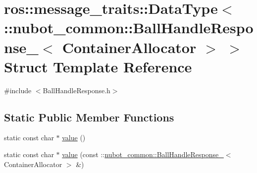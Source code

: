 \hypertarget{structros_1_1message__traits_1_1DataType_3_01_1_1nubot__common_1_1BallHandleResponse___3_01ContainerAllocator_01_4_01_4}{\section{ros\-:\-:message\-\_\-traits\-:\-:Data\-Type$<$ \-:\-:nubot\-\_\-common\-:\-:Ball\-Handle\-Response\-\_\-$<$ Container\-Allocator $>$ $>$ Struct Template Reference}
\label{structros_1_1message__traits_1_1DataType_3_01_1_1nubot__common_1_1BallHandleResponse___3_01ContainerAllocator_01_4_01_4}
}


{\ttfamily \#include $<$Ball\-Handle\-Response.\-h$>$}

\subsection*{Static Public Member Functions}
\begin{DoxyCompactItemize}
\item 
static const char $\ast$ \hyperlink{structros_1_1message__traits_1_1DataType_3_01_1_1nubot__common_1_1BallHandleResponse___3_01ContainerAllocator_01_4_01_4_a32801c48ec01bd98658004ca0d4297cd}{value} ()
\item 
static const char $\ast$ \hyperlink{structros_1_1message__traits_1_1DataType_3_01_1_1nubot__common_1_1BallHandleResponse___3_01ContainerAllocator_01_4_01_4_a838df64d9ced2cbe13ddbd8cc2a8df1c}{value} (const \-::\hyperlink{structnubot__common_1_1BallHandleResponse__}{nubot\-\_\-common\-::\-Ball\-Handle\-Response\-\_\-}$<$ Container\-Allocator $>$ \&)
\end{DoxyCompactItemize}


